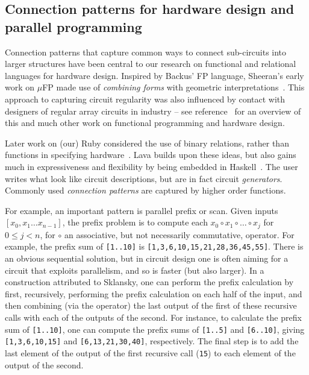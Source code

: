 \subsection{Connection patterns for hardware design and parallel programming}\label{sec:combinators}

Connection patterns that capture common ways to connect sub-circuits into larger structures have been central to our research on functional and relational languages for hardware design.
Inspired by Backus' FP language, Sheeran's early work on $\mu$FP made use of
{\em combining forms} with geometric interpretations~. This approach
to capturing circuit regularity was also influenced by contact
with designers of regular array circuits in industry -- see reference~ for an overview of this and much other work on functional programming and hardware design.

Later work on (our) Ruby considered the use of binary relations, rather than functions in specifying hardware~. Lava builds upon these ideas, but also gains much in expressiveness and flexibility by being embedded in Haskell~.
The user writes what look like circuit descriptions, but are in fact circuit {\em generators}. Commonly used {\em connection patterns} are captured by higher order functions.

For example, an important pattern is parallel prefix or scan. Given inputs\newline $[x_0, x_1 \ldots x_{n-1}]$, the prefix problem is to compute each $x_0 \circ x_1 \circ \ldots \circ x_j$ for $0 \leq j < n$, for $\circ$ an associative, but not necessarily commutative, operator. For example, the prefix sum of {\tt [1..10]} is {\tt [1,3,6,10,15,21,28,36,45,55]}. There is an obvious sequential solution, but in circuit design one is often aiming for a circuit that exploits parallelism, and so is faster (but also larger). In a construction attributed to Sklansky, one can perform the prefix
calculation by first, recursively, performing the prefix calculation on 
each half of the input, and then combining (via the operator) the last output of the first of these
recursive calls with each of the outputs of the second.
For instance, to calculate the prefix sum of {\tt [1..10]}, one can compute the prefix
sums of {\tt [1..5]} and {\tt [6..10]}, giving {\tt [1,3,6,10,15]}
and {\tt [6,13,21,30,40]}, respectively. 
The final step is to add the last element of the output of the first recursive call ({\tt 15}) to each element of
the output of the second.

